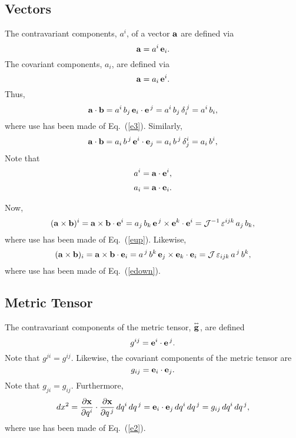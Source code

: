 \documentclass[12pt,prb,aps,notitlepage]{revtex4-1}
\newcommand{\smalltensor}[1]{\overset{\text{\tiny$\leftrightarrow$}}{#1}}
\begin{document}
\subsection{Vectors}
 The contravariant components, $a^i$,  of a vector ${\bf a}$ are defined via
 \begin{equation}
 {\bf a} = a^i\,{\bf e}_i.
 \end{equation}
 The covariant components, $a_i$, are defined via
 \begin{equation}
  {\bf a} = a_i\,{\bf e}^i.
  \end{equation}
  Thus,
  \begin{equation}
  {\bf a}\cdot{\bf b} = a^i\,b_j\,{\bf e}_i\cdot{\bf e}^{\,j} = a^i\,b_j\,\delta_i^{\,j} = a^i\,b_i,
  \end{equation}
  where use has been made of Eq.~(\ref{e3}). 
  Similarly, 
  \begin{equation}
  {\bf a}\cdot{\bf b} = a_i\,b^{\,j}\,{\bf e}^i\cdot{\bf e}_j = a_i\,b^{\,j}\,\delta^i_j = a_i\,b^i,
  \end{equation}
  Note that
  \begin{align}
  a^i &= {\bf a}\cdot{\bf e}^i,\\[0.5ex]
  a_i &= {\bf a}\cdot{\bf e}_i.
    \end{align}
    
 Now,
 \begin{equation}
 ({\bf a}\times{\bf b})^i = {\bf a}\times {\bf b}\cdot{\bf e}^i = a_j\,b_k\,{\bf e}^{\,j}\times{\bf e}^k\cdot{\bf e}^i ={\cal J}^{-1}\,\varepsilon^{ijk}\,a_j\,b_k,
 \end{equation}
 where use has been made of Eq.~(\ref{eup}). 
 Likewise, 
 \begin{equation}
 ({\bf a}\times{\bf b})_i = {\bf a}\times {\bf b}\cdot{\bf e}_i = a^{\,j}\,b^k\,{\bf e}_{j}\times{\bf e}_k\cdot{\bf e}_i={\cal J}\,\varepsilon_{ijk}\,a^{\,j}\,b^k,
 \end{equation}
 where use has been made of Eq.~(\ref{edown}). 

\subsection{Metric Tensor}  
 The contravariant components of the metric tensor, $\smalltensor{\bf g}$, are defined
 \begin{equation}
 g^{ij} = {\bf e}^i\cdot{\bf e}^{\,j}.
 \end{equation}
 Note that $g^{ji}=g^{ij}$. 
 Likewise, the covariant components of the metric tensor are  
 \begin{equation}
 g_{ij} = {\bf e}_i\cdot{\bf e}_j.
 \end{equation}
 Note that $g_{ji}= g_{ij}$. Furthermore,
 \begin{equation}
 dx^{2}= \frac{\partial {\bf x}}{\partial q^i}\cdot \frac{\partial {\bf x}}{\partial q^{\,j}}\,dq^i\,dq^{\,j} = {\bf e}_i\cdot{\bf e}_j\,dq^i\,dq^{\,j} = g_{ij}\,dq^i\,dq^{\,j},
 \end{equation}
 where use has been made of Eq.~(\ref{e2}). 
 
\end{document}
